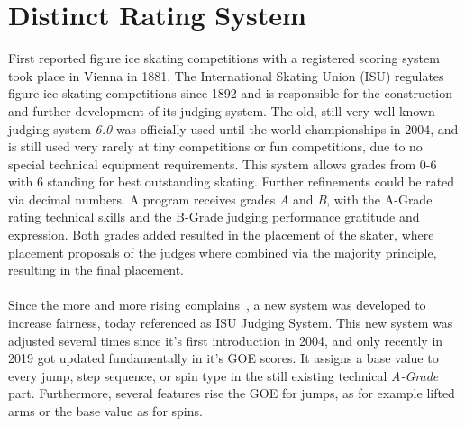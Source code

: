 %



\section{Distinct Rating System}
First reported figure ice skating competitions with a registered scoring system took place in Vienna in 1881.
The International Skating Union (ISU) regulates figure ice skating competitions since 1892 and is responsible for the
construction
and further development of its judging system.
The old, still very well known judging system \textit{6.0} was officially used until the world championships in 2004,
and
is still used very rarely at tiny competitions or fun competitions, due to no special technical equipment requirements.
This system allows grades from 0-6 with 6 standing for best outstanding skating.
Further refinements could be rated via decimal numbers.
A program receives grades \textit{A} and \textit{B}, with the A-Grade rating technical skills and the B-Grade judging
performance gratitude and expression.
Both grades added resulted in the placement of the skater, where placement proposals of the judges where combined via
the majority principle, resulting in the final placement.
\\\mbox{}\\
Since the more and more rising complains~\cite{unfairjudge}, a new system was developed to increase fairness, today
referenced as ISU
Judging System.
This new system was adjusted several times since it's first introduction in 2004, and only recently in 2019 got updated
fundamentally in it's GOE scores.
It assigns a base value to every jump, step sequence, or spin type in the still existing technical \textit{A-Grade}
part.
Furthermore, several features rise the GOE for jumps, as for example lifted arms or the base value as for spins.
